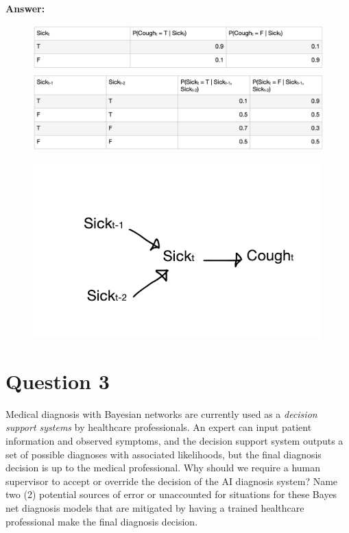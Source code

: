 \documentclass[12pt]{article}
\begin{document}
\noindent\textbf{Answer:}
\begin{figure}[h!]
    \includegraphics[width=\linewidth]{img/q2.png}
\end{figure}
\begin{figure}[h!]
    \includegraphics[width=\linewidth]{img/q2-1.png}
\end{figure}

\newpage

\section*{Question 3}
Medical diagnosis with Bayesian networks are currently used as
a \textit{decision support systems} by healthcare professionals. An expert can 
input patient information and observed symptoms, and the decision support system 
outputs a set of possible diagnoses with associated likelihoods, but the final 
diagnosis decision is up to the medical professional. Why should we require a human
supervisor to accept or override the decision of the AI diagnosis system? Name two 
(2) potential sources of error or unaccounted for situations for these Bayes net 
diagnosis models that are mitigated by having a trained healthcare professional 
make the final diagnosis decision. \\
\end{document}
